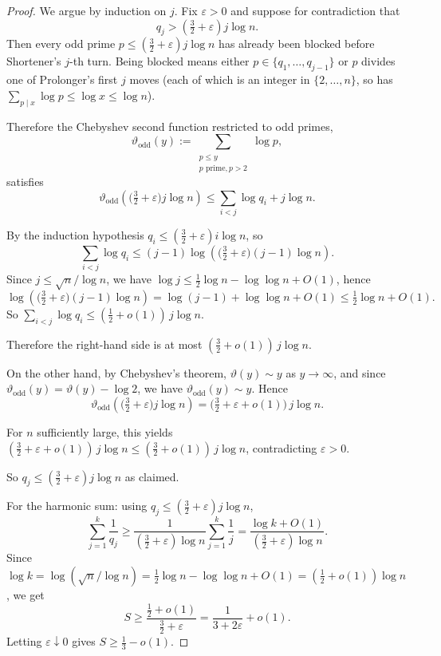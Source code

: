 \documentclass{article}
\begin{document}
\begin{proof}
We argue by induction on $j$. Fix $\varepsilon > 0$ and suppose for contradiction that
\[
q_j > \left(\tfrac{3}{2} + \varepsilon\right) j \log n.
\]
Then every odd prime $p \le (\tfrac{3}{2} + \varepsilon) j \log n$ has already been blocked before Shortener's $j$-th turn. Being blocked means either $p \in \{q_1, \ldots, q_{j-1}\}$ or $p$ divides one of Prolonger's first $j$ moves (each of which is an integer in $\{2, \ldots, n\}$, so has $\sum_{p \mid x} \log p \le \log x \le \log n$).

Therefore the Chebyshev second function restricted to odd primes,
\[
\vartheta_{\mathrm{odd}}(y) := \sum_{\substack{p \le y \\ p \text{ prime}, p > 2}} \log p,
\]
satisfies
\[
\vartheta_{\mathrm{odd}}\!\left(\bigl(\tfrac{3}{2} + \varepsilon\bigr) j \log n\right) \le \sum_{i < j} \log q_i + j \log n.
\]

By the induction hypothesis $q_i \le (\tfrac{3}{2} + \varepsilon) i \log n$, so
\[
\sum_{i < j} \log q_i \le (j-1) \log\!\left(\bigl(\tfrac{3}{2} + \varepsilon\bigr)(j-1) \log n\right).
\]
Since $j \le \sqrt{n}/\log n$, we have $\log j \le \tfrac{1}{2} \log n - \log\log n + O(1)$, hence
\[
\log\!\left(\bigl(\tfrac{3}{2} + \varepsilon\bigr)(j-1) \log n\right) = \log(j-1) + \log\log n + O(1) \le \tfrac{1}{2} \log n + O(1).
\]
So $\sum_{i < j} \log q_i \le (\tfrac{1}{2} + o(1))\,j \log n$.

Therefore the right-hand side is at most $(\tfrac{3}{2} + o(1))\, j \log n$.

On the other hand, by Chebyshev's theorem, $\vartheta(y) \sim y$ as $y \to \infty$, and since $\vartheta_{\mathrm{odd}}(y) = \vartheta(y) - \log 2$, we have $\vartheta_{\mathrm{odd}}(y) \sim y$. Hence
\[
\vartheta_{\mathrm{odd}}\!\left(\bigl(\tfrac{3}{2} + \varepsilon\bigr) j \log n\right) = \bigl(\tfrac{3}{2} + \varepsilon + o(1)\bigr)\,j \log n.
\]

For $n$ sufficiently large, this yields $(\tfrac{3}{2} + \varepsilon + o(1))\, j \log n \le (\tfrac{3}{2} + o(1))\, j \log n$, contradicting $\varepsilon > 0$.

So $q_j \le (\tfrac{3}{2} + \varepsilon) j \log n$ as claimed.

For the harmonic sum: using $q_j \le (\tfrac{3}{2} + \varepsilon) j \log n$,
\[
\sum_{j=1}^{k} \frac{1}{q_j} \ge \frac{1}{(\tfrac{3}{2} + \varepsilon)\log n} \sum_{j=1}^{k} \frac{1}{j} = \frac{\log k + O(1)}{(\tfrac{3}{2} + \varepsilon) \log n}.
\]
Since $\log k = \log(\sqrt{n}/\log n) = \tfrac{1}{2}\log n - \log\log n + O(1) = (\tfrac{1}{2} + o(1))\log n$, we get
\[
S \ge \frac{\tfrac{1}{2} + o(1)}{\tfrac{3}{2} + \varepsilon} = \frac{1}{3 + 2\varepsilon} + o(1).
\]
Letting $\varepsilon \downarrow 0$ gives $S \ge \tfrac{1}{3} - o(1)$.
\end{proof}
\end{document}
